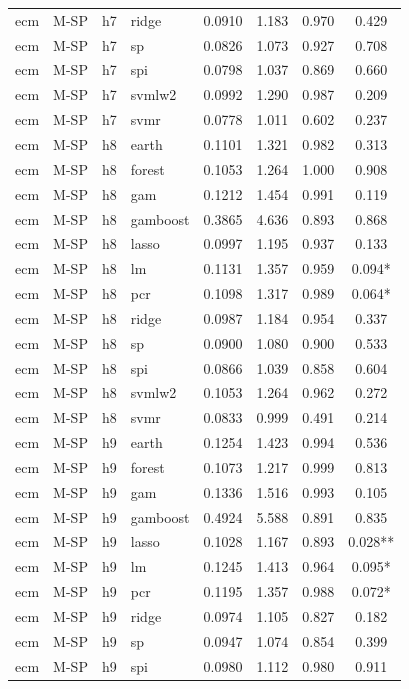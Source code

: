 \begin{ThreePartTable}
\begin{longtable}[t]{llclcccc}
ecm & M-SP & h7 & ridge & 0.0910 & 1.183 & 0.970 & 0.429\\
ecm & M-SP & h7 & sp & 0.0826 & 1.073 & 0.927 & 0.708\\
ecm & M-SP & h7 & spi & 0.0798 & 1.037 & 0.869 & 0.660\\
ecm & M-SP & h7 & svmlw2 & 0.0992 & 1.290 & 0.987 & 0.209\\
ecm & M-SP & h7 & svmr & 0.0778 & 1.011 & 0.602 & 0.237\\
\addlinespace
ecm & M-SP & h8 & earth & 0.1101 & 1.321 & 0.982 & 0.313\\
ecm & M-SP & h8 & forest & 0.1053 & 1.264 & 1.000 & 0.908\\
ecm & M-SP & h8 & gam & 0.1212 & 1.454 & 0.991 & 0.119\\
ecm & M-SP & h8 & gamboost & 0.3865 & 4.636 & 0.893 & 0.868\\
ecm & M-SP & h8 & lasso & 0.0997 & 1.195 & 0.937 & 0.133\\
ecm & M-SP & h8 & lm & 0.1131 & 1.357 & 0.959 & 0.094*\\
ecm & M-SP & h8 & pcr & 0.1098 & 1.317 & 0.989 & 0.064*\\
ecm & M-SP & h8 & ridge & 0.0987 & 1.184 & 0.954 & 0.337\\
ecm & M-SP & h8 & sp & 0.0900 & 1.080 & 0.900 & 0.533\\
ecm & M-SP & h8 & spi & 0.0866 & 1.039 & 0.858 & 0.604\\
ecm & M-SP & h8 & svmlw2 & 0.1053 & 1.264 & 0.962 & 0.272\\
ecm & M-SP & h8 & svmr & 0.0833 & 0.999 & 0.491 & 0.214\\
\addlinespace
ecm & M-SP & h9 & earth & 0.1254 & 1.423 & 0.994 & 0.536\\
ecm & M-SP & h9 & forest & 0.1073 & 1.217 & 0.999 & 0.813\\
ecm & M-SP & h9 & gam & 0.1336 & 1.516 & 0.993 & 0.105\\
ecm & M-SP & h9 & gamboost & 0.4924 & 5.588 & 0.891 & 0.835\\
ecm & M-SP & h9 & lasso & 0.1028 & 1.167 & 0.893 & 0.028**\\
ecm & M-SP & h9 & lm & 0.1245 & 1.413 & 0.964 & 0.095*\\
ecm & M-SP & h9 & pcr & 0.1195 & 1.357 & 0.988 & 0.072*\\
ecm & M-SP & h9 & ridge & 0.0974 & 1.105 & 0.827 & 0.182\\
ecm & M-SP & h9 & sp & 0.0947 & 1.074 & 0.854 & 0.399\\
ecm & M-SP & h9 & spi & 0.0980 & 1.112 & 0.980 & 0.911\\

\end{longtable}
\end{ThreePartTable}
